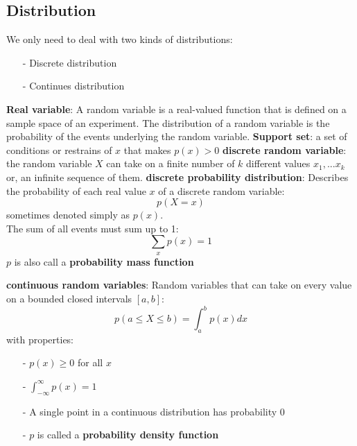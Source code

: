\documentclass[11pt]{article}
\begin{document}
\begin{flushleft}
\subsection{Distribution}
We only need to deal with two kinds of distributions:
\begin{itemize}
    \item [-] Discrete distribution
    \item [-] Continues distribution 
\end{itemize}
\textbf{Real variable}: A random variable is a real-valued function that is defined on a sample space of an experiment. The distribution of a random variable is the probability of the events underlying the random variable. \newline
\quad \newline
\textbf{Support set}: a set of conditions or restrains of $x$ that makes $p(x) > 0$ \newline
\quad \newline
\textbf{discrete random variable}: the random variable $X$ can take on a finite number of $k$ different values $x_1, ... x_k$ or, an infinite sequence of them. \newline
\quad \newline 
\textbf{discrete probability distribution}: Describes the probability of each real value $x$ of a discrete random variable: $$ p(X = x)$$sometimes denoted simply as $p(x)$.\\ The sum of all events must sum up to 1:\\ \quad  $$\sum_x p(x) = 1$$ 
$p$ is also call a \textbf{probability mass function}

\quad \newline 
\textbf{continuous random variables}: Random variables that can take on every value on a bounded closed intervals $[a,b]$:
$$p(a \leq X \leq b) = \int_a^b p(x) dx$$
with properties: \newline
\begin{itemize}
    \item[-] $p(x) \geq 0$ for all $x$
    \item[-] $\int_{-\infty}^{\infty}p(x) = 1$
    \item[-] A single point in a continuous distribution has probability 0
    \item[-] $p$ is called a \textbf{probability density function}
\end{itemize}


\end{flushleft}
\end{document}
